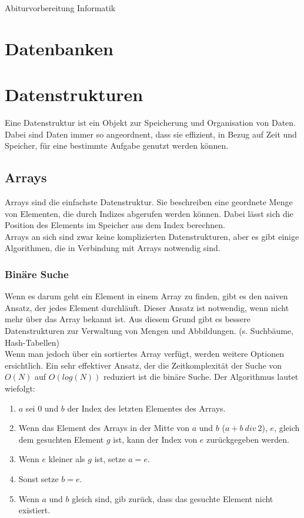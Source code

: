 \documentclass{article}
\begin{document}
\begin{titlepage}
    \begin{center}
        \Huge Abiturvorbereitung Informatik
    \end{center}
\end{titlepage}
\tableofcontents
\pagebreak
\section{Datenbanken}
\section{Datenstrukturen}
Eine Datenstruktur ist ein Objekt zur Speicherung und Organisation von Daten. Dabei sind Daten immer so angeordnent, dass sie effizient, in Bezug auf Zeit und Speicher, für eine bestimmte Aufgabe genutzt werden können.
\subsection{Arrays}
Arrays sind die einfachste Datenstruktur. Sie beschreiben eine geordnete Menge von Elementen, die durch Indizes abgerufen werden können. Dabei lässt sich die Position des Elements im Speicher aus dem Index berechnen.\\
Arrays an sich sind zwar keine komplizierten Datenstrukturen, aber es gibt einige Algorithmen, die in Verbindung mit Arrays notwendig sind.
\subsubsection{Binäre Suche}
Wenn es darum geht ein Element in einem Array zu finden, gibt es den naiven Ansatz, der jedes Element durchläuft. Dieser Ansatz ist notwendig, wenn nicht mehr über das Array bekannt ist. Aus diesem Grund gibt es bessere Datenstrukturen zur Verwaltung von Mengen und Abbildungen. (s. Suchbäume, Hash-Tabellen)\\
Wenn man jedoch über ein sortiertes Array verfügt, werden weitere Optionen ersichtlich. Ein sehr effektiver Ansatz, der die Zeitkomplexität der Suche von $O(N)$ auf $O(log(N))$ reduziert ist die binäre Suche. Der Algorithmus lautet wiefolgt:
\begin{enumerate}
    \item $a$ sei $0$ und $b$ der Index des letzten Elementes des Arrays.
    \item Wenn das Element des Arrays in der Mitte von $a$ und $b$ ($a + b\: div\: 2$), $e$, gleich dem gesuchten Element $g$ ist, kann der Index von $e$ zurückgegeben werden.
    \item Wenn $e$ kleiner als $g$ ist, setze $a=e$.
    \item Sonst setze $b=e$.
    \item Wenn $a$ und $b$ gleich sind, gib zurück, dass das gesuchte Element nicht existiert.
\end{enumerate}
\end{document}
